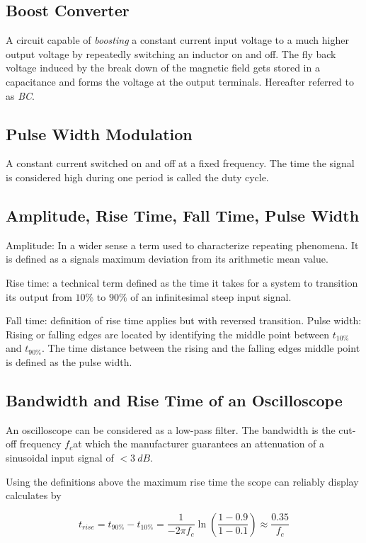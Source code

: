     \subsection*{Boost Converter}
        A circuit capable of \textit{boosting} a constant current input voltage to a much higher output voltage by repeatedly
        switching an inductor on and off. The fly back voltage induced by the break down of the magnetic field gets stored in
        a capacitance and forms the voltage at the output terminals. Hereafter referred to as \textit{BC}.
    \subsection*{Pulse Width Modulation}
        A constant current switched on and off at a fixed frequency. The time the signal is considered high during one period
        is called the duty cycle.
    \subsection*{Amplitude, Rise Time, Fall Time, Pulse Width}
        Amplitude: In a wider sense a term used to characterize repeating phenomena. It is defined as a signals maximum deviation
        from its arithmetic mean value.\par
        Rise time: a technical term defined as the time it takes for a system to transition its output from \( 10\% \) to \( 90\% \)
        of an infinitesimal steep input signal.\par
        Fall time: definition of rise time applies but with reversed transition.
        Pulse width: Rising or falling edges are located by identifying the middle point between \( t_{10\%} \) and \( t_{90\%} \).
        The time distance between the rising and the falling edges middle point is defined as the pulse width.
    \subsection*{Bandwidth and Rise Time of an Oscilloscope}
        An oscilloscope can be considered as a low-pass filter. The bandwidth is the cut-off frequency \( f_c \)at which the manufacturer
        guarantees an attenuation of a sinusoidal input signal of \( < \SI{3}{dB} \).\par
        Using the definitions above the maximum rise time the scope can reliably display calculates by\par
        \begin{equation}
            t_{rise} = t_{90\%} - t_{10\%} = \frac{1}{-2\pi f_c} \ln\left( \frac{1-0.9}{1-0.1} \right) \approx \frac{0.35}{f_c}
            \label{eq:bandwidth_and_riseTime}
        \end{equation}
